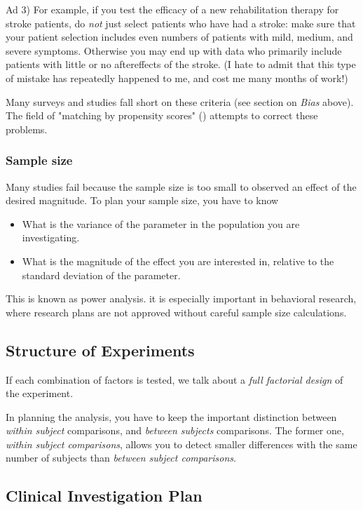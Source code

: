 Ad 3) For example, if you test the efficacy of a new rehabilitation therapy for stroke patients, do \emph{not} just select patients who have had a stroke: make sure that your patient selection includes even numbers of patients with mild, medium, and severe symptoms. Otherwise you may end up with data who primarily include patients with little or no aftereffects of the stroke. (I hate to admit that this type of mistake has repeatedly happened to me, and cost me many months of work!)

Many surveys and studies fall short on these criteria (see section on \emph{Bias} above). The field of "matching by propensity scores" (\cite{Rosenbaum1983}) attempts to correct these problems.

\subsubsection{Sample size}
Many studies fail because the sample size is too small to observed an effect of the desired magnitude. To plan your sample size, you have to know
\begin{itemize}
  \item What is the variance of the parameter in the population you are investigating.
  \item What is the magnitude of the effect you are interested in, relative to the standard deviation of the parameter.
\end{itemize}

This is known as \gls{power analysis}. it is especially important in behavioral research, where research plans are not approved without careful sample size calculations.

\subsection{Structure of Experiments}

If each combination of factors is tested, we talk about a \emph{full factorial design} of the experiment.

In planning the analysis, you have to keep the important distinction between \emph{within subject} comparisons, and \emph{between subjects} comparisons. The former one, \emph{within subject comparisons}, allows you to detect smaller differences with the same number of subjects than \emph{between subject comparisons}.

\subsection{Clinical Investigation Plan}

